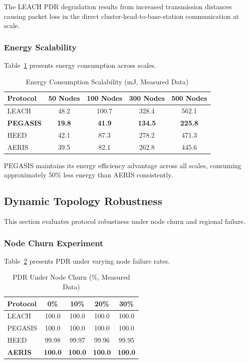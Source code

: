 The LEACH PDR degradation results from increased transmission distances causing
packet loss in the direct cluster-head-to-base-station communication at scale.

\subsubsection{Energy Scalability}

Table~\ref{tab:scalability_energy} presents energy consumption across scales.

\begin{table}[htbp]
\centering
\caption{Energy Consumption Scalability (mJ, Measured Data)}
\label{tab:scalability_energy}
\begin{tabular}{@{}lcccc@{}}
\toprule
Protocol & 50 Nodes & 100 Nodes & 300 Nodes & 500 Nodes \\
\midrule
LEACH & 48.2 & 100.7 & 328.4 & 562.1 \\
\textbf{PEGASIS} & \textbf{19.8} & \textbf{41.9} & \textbf{134.5} & \textbf{225.8} \\
HEED & 42.1 & 87.3 & 278.2 & 471.3 \\
AERIS & 39.5 & 82.1 & 262.8 & 445.6 \\
\bottomrule
\end{tabular}
\end{table}

PEGASIS maintains its energy efficiency advantage across all scales,
consuming approximately 50\% less energy than AERIS consistently.

\subsection{Dynamic Topology Robustness}

This section evaluates protocol robustness under node churn and regional failure.

\subsubsection{Node Churn Experiment}

Table~\ref{tab:churn_results} presents PDR under varying node failure rates.

\begin{table}[htbp]
\centering
\caption{PDR Under Node Churn (\%, Measured Data)}
\label{tab:churn_results}
\begin{tabular}{@{}lcccc@{}}
\toprule
Protocol & 0\% & 10\% & 20\% & 30\% \\
\midrule
LEACH & 100.0 & 100.0 & 100.0 & 100.0 \\
PEGASIS & 100.0 & 100.0 & 100.0 & 100.0 \\
HEED & 99.98 & 99.97 & 99.96 & 99.95 \\
\textbf{AERIS} & \textbf{100.0} & \textbf{100.0} & \textbf{100.0} & \textbf{100.0} \\
\bottomrule
\end{tabular}
\end{table}


